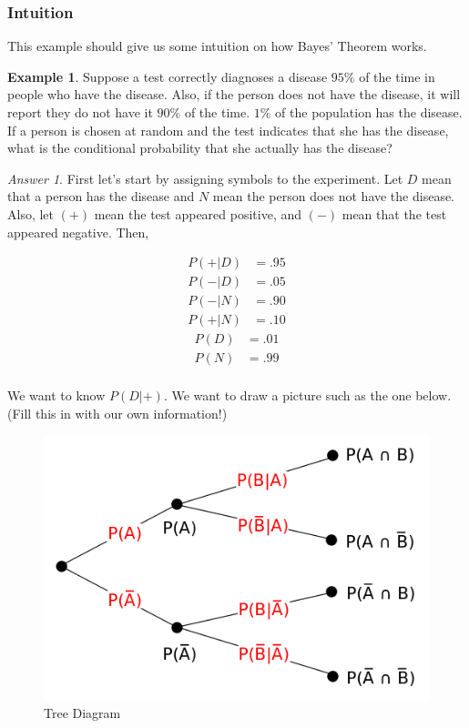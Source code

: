\documentclass{article}
\theoremstyle{plain}
\theoremstyle{definition}
\newtheorem{example}{Example}[section]
\theoremstyle{remark}
\newtheorem*{answer}{Answer}
\begin{document}
\subsubsection{Intuition}
This example should give us some intuition on how Bayes' Theorem works.
\begin{example}
Suppose a test correctly diagnoses a disease $95\%$ of the time in people who have the disease. Also, if the person does not have the disease, it will report they do not have it $90\%$ of the time. $1\%$ of the population has the disease. If a person is chosen at random and the test indicates that she has the disease, what is the conditional probability that she actually has the disease?

\begin{answer}
First let's start by assigning symbols to the experiment. Let $D$ mean that a person has the disease and $N$ mean the person does not have the disease. Also, let $(+)$ mean the test appeared positive, and $(-)$ mean that the test appeared negative. Then,
\begin{multicols}{3}
\begin{align*}
  P(+|D) &= .95\\
  P(-|D) &= .05
\end{align*}
\vfill
\columnbreak
\begin{align*}
P(-|N) &= .90\\
P(+|N) &= .10
\end{align*}
\vfill
\columnbreak
\begin{align*}
  P(D) &= .01\\
  P(N) &= .99\\
\end{align*}
\vfill
\end{multicols}
We want to know $P(D|+)$. We want to draw a picture such as the one below. (Fill this in with our own information!)
\end{answer}
\end{example}
\begin{figure}[h!]
\centering
\includegraphics[scale=.5]{tree_diagram}
\caption{Tree Diagram}
\label{tree}
\end{figure}
\end{document}
